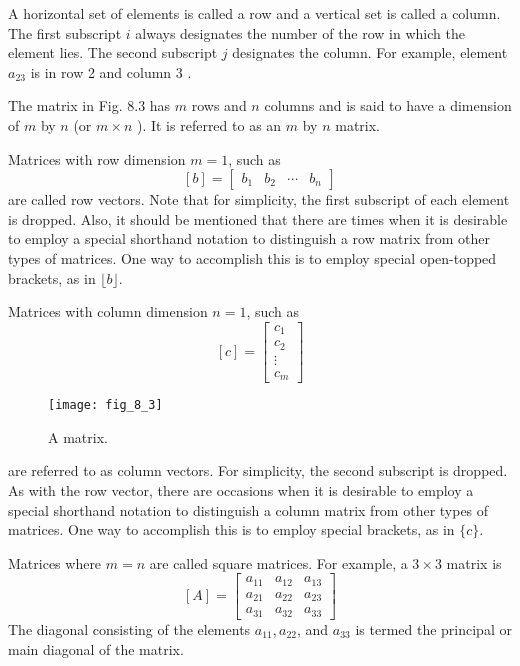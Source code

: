 \documentclass[../main.tex]{subfiles}
\begin{document}
A horizontal set of elements is called a row and a vertical set is called a column. The first subscript $i$ always designates the number of the row in which the element lies. The second subscript $j$ designates the column. For example, element $a_{23}$ is in row 2 and column 3 .

The matrix in Fig. $8.3$ has $m$ rows and $n$ columns and is said to have a dimension of $m$ by $n$ (or $m \times n$ ). It is referred to as an $m$ by $n$ matrix.

Matrices with row dimension $m=1$, such as
$$
[b]=\left[\begin{array}{llll}
b_{1} & b_{2} & \cdots & b_{n}
\end{array}\right]
$$
are called row vectors. Note that for simplicity, the first subscript of each element is dropped. Also, it should be mentioned that there are times when it is desirable to employ a special shorthand notation to distinguish a row matrix from other types of matrices. One way to accomplish this is to employ special open-topped brackets, as in $\lfloor b\rfloor.$

Matrices with column dimension $n=1$, such as
$$
[c]=\left[\begin{array}{c}
c_{1} \\
c_{2} \\
\vdots \\
c_{m}
\end{array}\right]
$$

\begin{figure}[H]
	\centering
	\texttt{[image: fig\_8\_3]}
	\caption{\textsf{A matrix.}}
	\label{fig:fig_8_3}
\end{figure}

\noindent are referred to as column vectors. For simplicity, the second subscript is dropped. As with the row vector, there are occasions when it is desirable to employ a special shorthand notation to distinguish a column matrix from other types of matrices. One way to accomplish this is to employ special brackets, as in $\{c\}$.

Matrices where $m=n$ are called square matrices. For example, a $3 \times 3$ matrix is
$$
[A]=\left[\begin{array}{lll}
a_{11} & a_{12} & a_{13} \\
a_{21} & a_{22} & a_{23} \\
a_{31} & a_{32} & a_{33}
\end{array}\right]
$$
The diagonal consisting of the elements $a_{11}, a_{22}$, and $a_{33}$ is termed the principal or main diagonal of the matrix.
\end{document}
